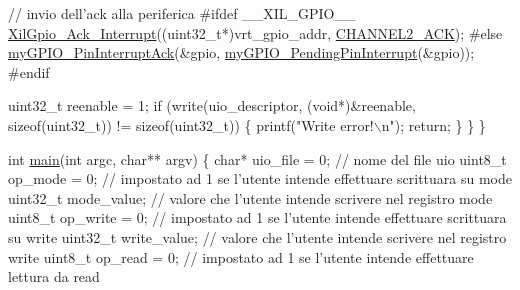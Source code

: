 \begin{DoxyCodeInclude}
{{{{{{        \textcolor{comment}{// invio dell'ack alla periferica}
\textcolor{preprocessor}{        #ifdef \_\_XIL\_GPIO\_\_}
        \hyperlink{xil__gpio_8c_ad7b9691b1dc24679b60c25a6d5dc9647}{XilGpio\_Ack\_Interrupt}((uint32\_t*)vrt\_gpio\_addr, 
      \hyperlink{xil__gpio_8h_af56fe75e9fc0fcfc0b8fdda217d9d842}{CHANNEL2\_ACK});
\textcolor{preprocessor}{        #else}
        \hyperlink{group__bare-metal_gab6ad3dda867515825890c97dbf6f55db}{myGPIO\_PinInterruptAck}(&gpio, 
      \hyperlink{group__bare-metal_ga6115bde39f860d4e76e7d8f421ce222c}{myGPIO\_PendingPinInterrupt}(&gpio));
\textcolor{preprocessor}{        #endif}

        uint32\_t reenable = 1;
        \textcolor{keywordflow}{if} (write(uio\_descriptor, (\textcolor{keywordtype}{void}*)&reenable, \textcolor{keyword}{sizeof}(uint32\_t)) != \textcolor{keyword}{sizeof}(uint32\_t)) \{
            printf(\textcolor{stringliteral}{"Write error!\(\backslash\)n"});
            \textcolor{keywordflow}{return};
        \}
    \}
\}

\textcolor{keywordtype}{int} \hyperlink{uio-int_8c_a3c04138a5bfe5d72780bb7e82a18e627}{main}(\textcolor{keywordtype}{int} argc, \textcolor{keywordtype}{char}** argv) \{
    \textcolor{keywordtype}{char}* uio\_file = 0;         \textcolor{comment}{// nome del file uio}
    uint8\_t op\_mode = 0;        \textcolor{comment}{// impostato ad 1 se l'utente intende effettuare scrittuara su mode}
    uint32\_t mode\_value;        \textcolor{comment}{// valore che l'utente intende scrivere nel registro mode}
    uint8\_t op\_write = 0;       \textcolor{comment}{// impostato ad 1 se l'utente intende effettuare scrittuara su write}
    uint32\_t write\_value;       \textcolor{comment}{// valore che l'utente intende scrivere nel registro write}
    uint8\_t op\_read = 0;        \textcolor{comment}{// impostato ad 1 se l'utente intende effettuare lettura da read}

}}}}}}
\end{DoxyCodeInclude}
